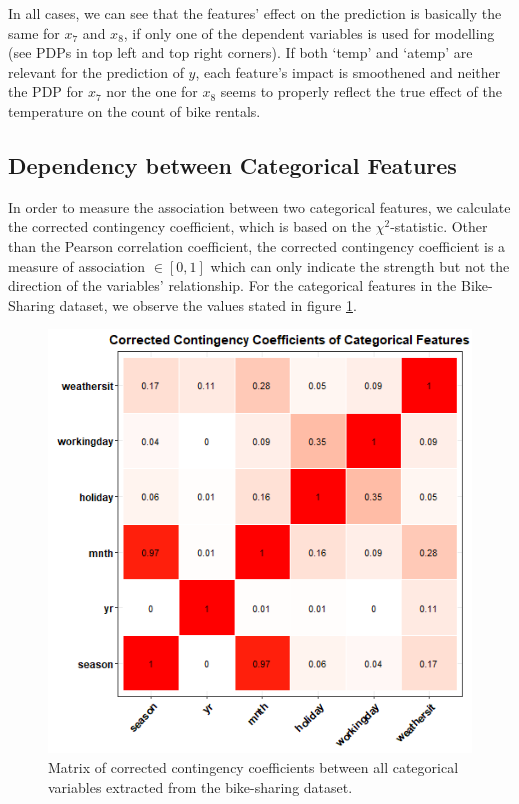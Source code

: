 \documentclass[
]{krantz}
\begin{document}
In all cases, we can see that the features' effect on the prediction is basically the same for \(x_7\) and \(x_8\), if only one of the dependent variables is used for modelling (see PDPs in top left and top right corners). If both `temp' and `atemp' are relevant for the prediction of \(y\), each feature's impact is smoothened and neither the PDP for \(x_7\) nor the one for \(x_8\) seems to properly reflect the true effect of the temperature on the count of bike rentals.

\hypertarget{dependency-between-categorical-features}{%
\subsection{Dependency between Categorical Features}\label{dependency-between-categorical-features}}

In order to measure the association between two categorical features, we calculate the corrected contingency coefficient, which is based on the \(\chi^2\)-statistic. Other than the Pearson correlation coefficient, the corrected contingency coefficient is a measure of association \(\in [0,1]\) which can only indicate the strength but not the direction of the variables' relationship.\citep{fahrmeir2016statistik} For the categorical features in the Bike-Sharing dataset, we observe the values stated in figure \ref{fig:Figure07}.

\begin{figure}

{\centering \includegraphics[width=0.8\linewidth]{images/VK_PDP_7_Cat_Correlation_Matrix} 

}

\caption{Matrix of corrected contingency coefficients between all categorical variables extracted from the bike-sharing dataset.}\label{fig:Figure07}
\end{figure}
\end{document}
